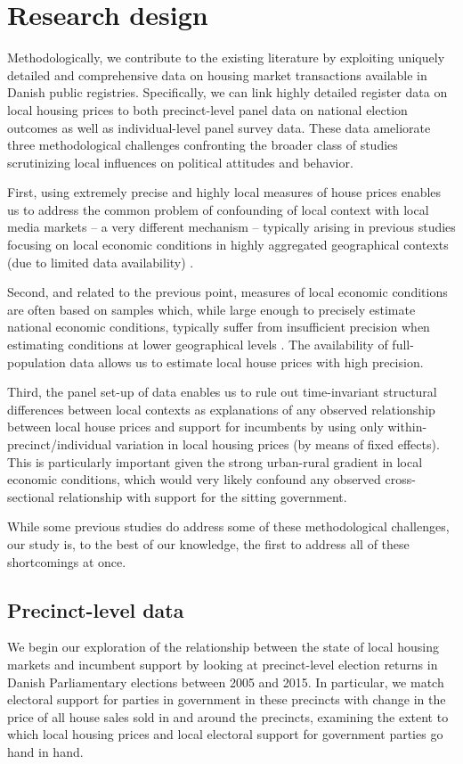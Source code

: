 \documentclass[12pt,a4paper]{article}
\begin{document}
	\section{Research design}\label{resdesign}
	
	Methodologically, we contribute to the existing literature by exploiting uniquely detailed and comprehensive data on housing market transactions available in Danish public registries. Specifically, we can link highly detailed register data on local housing prices to both precinct-level panel data on national election outcomes as well as individual-level panel survey data. These data ameliorate three methodological challenges confronting the broader class of studies scrutinizing local influences on political attitudes and behavior.
	
	First, using extremely precise and highly local measures of house prices enables us to address the common problem of confounding of local context with local media markets -- a very different mechanism -- typically arising in previous studies focusing on local economic conditions in highly aggregated geographical contexts (due to limited data availability) \citep[][]{bisgaard2016reconsidering}.  
	
	Second, and related to the previous point, measures of local economic conditions are often based on samples which, while large enough to precisely estimate national economic conditions, typically suffer from insufficient precision when estimating conditions at lower geographical levels \citep[][]{healy2014presidential}. The availability of full-population data allows us to estimate local house prices with high precision.
	
	Third, the panel set-up of data enables us to rule out time-invariant structural differences between local contexts as explanations of any observed relationship between local house prices and support for incumbents by using only within-precinct/individual variation in local housing prices (by means of fixed effects). This is particularly important given the strong urban-rural gradient in local economic conditions, which would very likely confound any observed cross-sectional relationship with support for the sitting government.
	
	While some previous studies do address some of these methodological challenges, our study is, to the best of our knowledge, the first to address all of these shortcomings at once.
	
	
	\subsection{Precinct-level data}\label{precinctlevel}
	We begin our exploration of the relationship between the state of local housing markets and incumbent support by looking at precinct-level election returns in Danish Parliamentary elections between 2005 and 2015. In particular, we match electoral support for parties in government in these precincts with change in the price of all house sales sold in and around the precincts, examining the extent to which local housing prices and local electoral support for government parties go hand in hand.
	
\end{document}
